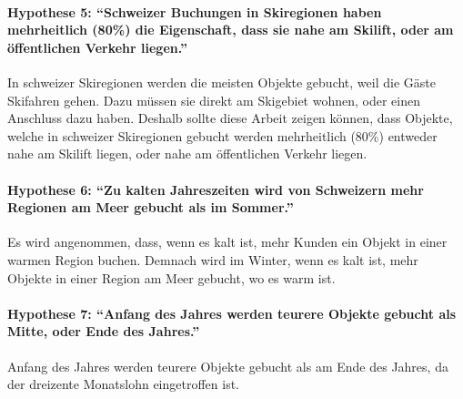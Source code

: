\paragraph{Hypothese 5: "`Schweizer Buchungen in Skiregionen haben mehrheitlich (80\%) die Eigenschaft, dass sie nahe am Skilift, oder am öffentlichen Verkehr liegen."'} In schweizer Skiregionen werden die meisten Objekte gebucht, weil die Gäste Skifahren gehen. Dazu müssen sie direkt am Skigebiet wohnen, oder einen Anschluss dazu haben. Deshalb sollte diese Arbeit zeigen können, dass Objekte, welche in schweizer Skiregionen gebucht werden mehrheitlich (80\%) entweder nahe am Skilift liegen, oder nahe am öffentlichen Verkehr liegen.
\paragraph{Hypothese 6: "`Zu kalten Jahreszeiten wird von Schweizern mehr Regionen am Meer gebucht als im Sommer."'} Es wird angenommen, dass, wenn es kalt ist, mehr Kunden ein Objekt in einer warmen Region buchen. Demnach wird im Winter, wenn es kalt ist, mehr Objekte in einer Region am Meer gebucht, wo es warm ist. 
\paragraph{Hypothese 7: "`Anfang des Jahres werden teurere Objekte gebucht als Mitte, oder Ende des Jahres."'} Anfang des Jahres werden teurere Objekte gebucht als am Ende des Jahres, da der dreizente Monatslohn eingetroffen ist.

